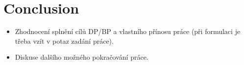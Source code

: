 \documentclass[11pt,twoside,a4paper]{book}
\begin{document}
 
\chapter{Conclusion}

\begin{itemize}
\item Zhodnocení splnění cílů DP/BP a  vlastního přínosu práce (při formulaci je třeba vzít v potaz zadání práce).
\item Diskuse dalšího možného pokračování práce.\end{itemize}   

%

%
%
{
\def\CS{$\cal C\kern-0.1667em\lower.5ex\hbox{$\cal S$}\kern-0.075em $}

}

%

\end{document}
